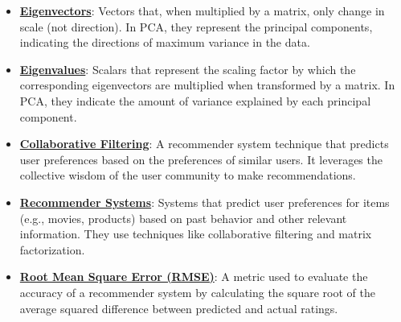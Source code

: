 \documentclass{article}%
\begin{document}
\begin{itemize}[leftmargin=*]
\item \href{https://purdue.brightspace.com/d2l/common/assets/pdfjs-d2l-dist/1.0.14-legacy/web/viewer.html?file=\%2Fcontent\%2Fenforced\%2F1095467-wl.202510.CS.24300.001\%2F11L2-svd-pca-recommender.pdf\%3Fou\%3D1095467\&lang=en-us\&container=d2l-fileviewer-rendered-pdf\&fullscreen=d2l-fileviewer-rendered-pdf-dialog\&height=667#page=17}{\textbf{Eigenvectors}}: Vectors that, when multiplied by a matrix, only change in scale (not direction). In PCA, they represent the principal components, indicating the directions of maximum variance in the data.%
\item \href{https://purdue.brightspace.com/d2l/common/assets/pdfjs-d2l-dist/1.0.14-legacy/web/viewer.html?file=\%2Fcontent\%2Fenforced\%2F1095467-wl.202510.CS.24300.001\%2F11L2-svd-pca-recommender.pdf\%3Fou\%3D1095467\&lang=en-us\&container=d2l-fileviewer-rendered-pdf\&fullscreen=d2l-fileviewer-rendered-pdf-dialog\&height=667#page=17}{\textbf{Eigenvalues}}: Scalars that represent the scaling factor by which the corresponding eigenvectors are multiplied when transformed by a matrix. In PCA, they indicate the amount of variance explained by each principal component.%
\item \href{https://purdue.brightspace.com/d2l/common/assets/pdfjs-d2l-dist/1.0.14-legacy/web/viewer.html?file=\%2Fcontent\%2Fenforced\%2F1095467-wl.202510.CS.24300.001\%2F11L2-svd-pca-recommender.pdf\%3Fou\%3D1095467\&lang=en-us\&container=d2l-fileviewer-rendered-pdf\&fullscreen=d2l-fileviewer-rendered-pdf-dialog\&height=667#page=33}{\textbf{Collaborative Filtering}}: A recommender system technique that predicts user preferences based on the preferences of similar users. It leverages the collective wisdom of the user community to make recommendations.%
\item \href{https://purdue.brightspace.com/d2l/common/assets/pdfjs-d2l-dist/1.0.14-legacy/web/viewer.html?file=\%2Fcontent\%2Fenforced\%2F1095467-wl.202510.CS.24300.001\%2F11L2-svd-pca-recommender.pdf\%3Fou\%3D1095467\&lang=en-us\&container=d2l-fileviewer-rendered-pdf\&fullscreen=d2l-fileviewer-rendered-pdf-dialog\&height=667#page=29}{\textbf{Recommender Systems}}: Systems that predict user preferences for items (e.g., movies, products) based on past behavior and other relevant information. They use techniques like collaborative filtering and matrix factorization.%
\item \href{https://purdue.brightspace.com/d2l/common/assets/pdfjs-d2l-dist/1.0.14-legacy/web/viewer.html?file=\%2Fcontent\%2Fenforced\%2F1095467-wl.202510.CS.24300.001\%2F11L2-svd-pca-recommender.pdf\%3Fou\%3D1095467\&lang=en-us\&container=d2l-fileviewer-rendered-pdf\&fullscreen=d2l-fileviewer-rendered-pdf-dialog\&height=667#page=49}{\textbf{Root Mean Square Error (RMSE)}}: A metric used to evaluate the accuracy of a recommender system by calculating the square root of the average squared difference between predicted and actual ratings.%

\end{itemize}
\end{document}
